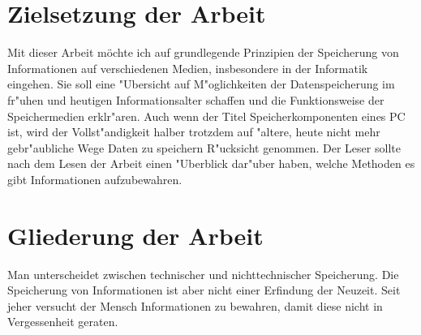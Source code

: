 \section{Zielsetzung der Arbeit}
\label{ch:Einleitung:sec:Zielsetzung}

Mit dieser Arbeit möchte ich auf grundlegende Prinzipien der Speicherung von Informationen auf verschiedenen Medien, insbesondere in der Informatik eingehen. Sie soll eine "Ubersicht auf M"oglichkeiten der Datenspeicherung im fr"uhen und heutigen Informationsalter schaffen und die Funktionsweise der Speichermedien erklr"aren. Auch wenn der Titel \glqq Speicherkomponenten eines PC \grqq{} ist, wird der Vollst"andigkeit halber trotzdem auf "altere, heute nicht mehr gebr"aubliche Wege Daten zu speichern R"ucksicht genommen. Der Leser sollte nach dem Lesen der Arbeit einen "Uberblick dar"uber haben, welche Methoden es gibt Informationen aufzubewahren. 

\section{Gliederung der Arbeit}
\label{ch:Einleitung:sec:Gliederung}

Man unterscheidet zwischen technischer und nichttechnischer Speicherung. Die Speicherung von Informationen ist aber nicht einer Erfindung der Neuzeit. Seit jeher versucht der Mensch Informationen zu bewahren, damit diese nicht in Vergessenheit geraten.

